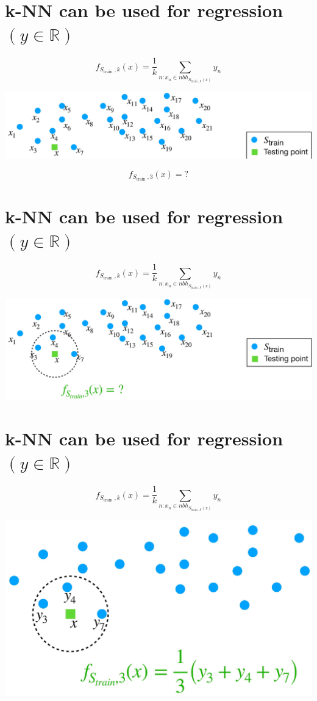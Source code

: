 \documentclass[10pt]{article}
\begin{document}
\section*{k-NN can be used for regression $(y \in \mathbb{R})$}
$$
f_{S_{\text {train }}, k}(x)=\frac{1}{k} \sum_{n: x_{n} \in n b h_{S_{\text {train }, k}(x)}} y_{n}
$$

\begin{center}
\includegraphics[max width=\textwidth]{2023_12_30_f937b0007b5d87b39f79g-11}
\end{center}

$$
f_{S_{\text {train }}, 3}(x)=?
$$

\section*{k-NN can be used for regression $(y \in \mathbb{R})$}
$$
f_{S_{\text {train }}, k}(x)=\frac{1}{k} \sum_{n: x_{n} \in n b h_{S_{\text {train }, k}(x)}} y_{n}
$$

\begin{center}
\includegraphics[max width=\textwidth]{2023_12_30_f937b0007b5d87b39f79g-12}
\end{center}

\section*{k-NN can be used for regression $(y \in \mathbb{R})$}
$$
f_{S_{\text {train }}, k}(x)=\frac{1}{k} \sum_{n: x_{n} \in n b h_{S_{\text {train }, k}(x)}} y_{n}
$$

\begin{center}
\includegraphics[max width=\textwidth]{2023_12_30_f937b0007b5d87b39f79g-13}
\end{center}
\end{document}
